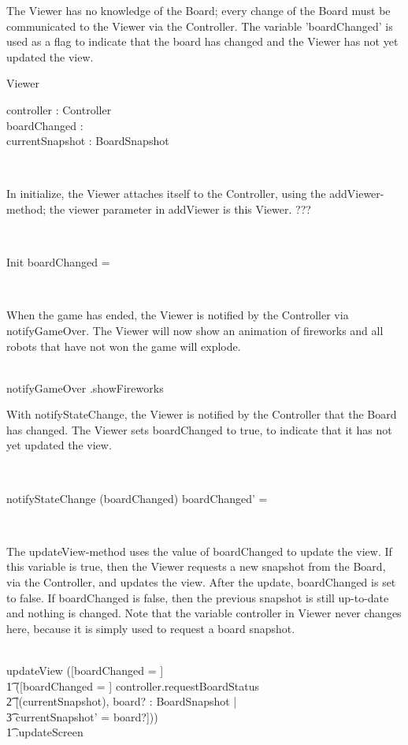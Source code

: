 The Viewer has no knowledge of the Board; every change of the Board must be communicated to the Viewer via the Controller. The variable 'boardChanged' is used as a flag to indicate that the board has changed and the Viewer has not yet updated the view.
\begin{class}{Viewer}
\begin{state}
controller : Controller \\
boardChanged : \bool \\
currentSnapshot : BoardSnapshot \\
\end{state}\\
\begin{classcom}
In initialize, the Viewer attaches itself to the Controller, using the addViewer-method; the viewer parameter in addViewer is this Viewer. ???
\end{classcom} \\
\begin{schema}{Init}
boardChanged = \false
\end{schema}\\
\begin{classcom}
When the game has ended, the Viewer is notified by the Controller via notifyGameOver. The Viewer will now show an animation of fireworks and all robots that have not won the game will explode.
\end{classcom} \\
notifyGameOver \sdef {}.showFireworks \\
\begin{classcom}
With notifyStateChange, the Viewer is notified by the Controller that the Board has changed. The Viewer sets boardChanged to true, to indicate that it has not yet updated the view.
\end{classcom} \\
\begin{schema}{notifyStateChange}
\Delta (boardChanged)
\where
boardChanged' = \true
\end{schema}\\
\znewpage
\begin{classcom}
The updateView-method uses the value of boardChanged to update the view. If this variable is true, then the Viewer requests a new snapshot from the Board, via the Controller, and updates the view. After the update, boardChanged is set to false. If boardChanged is false, then the previous snapshot is still up-to-date and nothing is changed. Note that the variable controller in Viewer never changes here, because it is simply used to request a board snapshot.
\end{classcom} \\
updateView \sdef ([boardChanged = \false] \;\; [] \\ \t1
([boardChanged = \true] \wedge controller.requestBoardStatus \;\; \comp \\ \t2 [\Delta(currentSnapshot), board? : BoardSnapshot | \\ \t3 currentSnapshot' = board?])) \; \; \comp \\ \t1 .updateScreen
\end{class}

